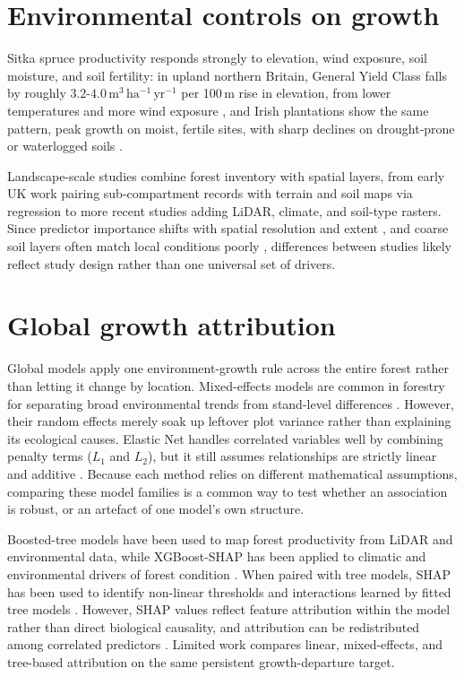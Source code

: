\documentclass[logo,msc,ai]{infthesis}           %
\begin{document}
\section{Environmental controls on growth}
Sitka spruce productivity responds strongly to elevation, wind exposure, soil moisture, and soil fertility: in upland northern Britain, General Yield Class falls by roughly $3.2\text{-}4.0\,\mathrm{m^3\,ha^{-1}\,yr^{-1}}$ per 100\,m rise in elevation, from lower temperatures and more wind exposure \cite{worrell1990Productivity1_C1_SS}, and Irish plantations show the same pattern, peak growth on moist, fertile sites, with sharp declines on drought-prone or waterlogged soils \cite{farrelly2011Sitka_C1_SS}.

Landscape-scale studies combine forest inventory with spatial layers, from early UK work pairing sub-compartment records with terrain and soil maps via regression \cite{bateman1998Using_C1_SS} to more recent studies adding LiDAR, climate, and soil-type rasters. Since predictor importance shifts with spatial resolution and extent \cite{fricker2019More_C3_LID}, and coarse soil layers often match local conditions poorly \cite{miller2024Assessing_C2_CR}, differences between studies likely reflect study design rather than one universal set of drivers.

\section{Global growth attribution}
Global models apply one environment-growth rule across the entire forest rather than letting it change by location. Mixed-effects models are common in forestry for separating broad environmental trends from stand-level differences \cite{harrison2018Brief_C5_EVAL, socha2016Assessment_C2_CR}. However, their random effects merely soak up leftover plot variance rather than explaining its ecological causes. Elastic Net handles correlated variables well by combining penalty terms ($L_1$ and $L_2$), but it still assumes relationships are strictly linear and additive \cite{zou2005Regularization_C4_NN}. Because each method relies on different mathematical assumptions, comparing these model families is a common way to test whether an association is robust, or an artefact of one model's own structure.

Boosted-tree models have been used to map forest productivity from LiDAR and environmental data, while XGBoost-SHAP has been applied to climatic and environmental drivers of forest condition \cite{puliti2023Tree_C2_CR, chen2016XGBoost_C4_NN}. When paired with tree models, SHAP has been used to identify non-linear thresholds and interactions learned by fitted tree models \cite{lundberg2017Unified_C7_XAI}. However, SHAP values reflect feature attribution within the model rather than direct biological causality, and attribution can be redistributed among correlated predictors \cite{aas2021Explaining_C7_XAI}. Limited work compares linear, mixed-effects, and tree-based attribution on the same persistent growth-departure target.
\end{document}
